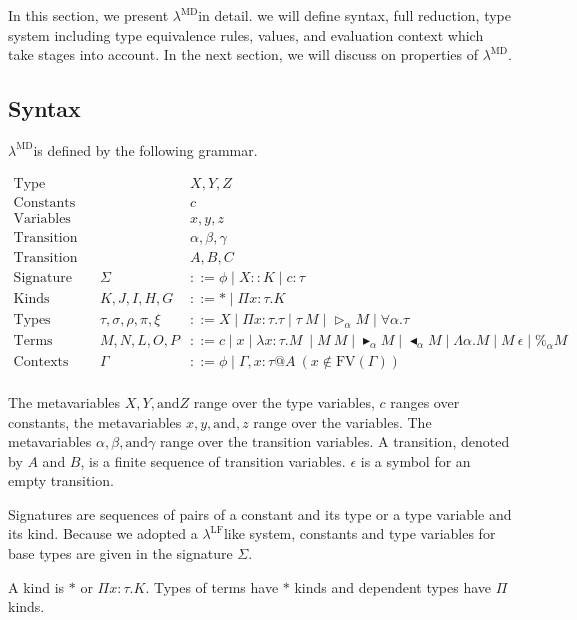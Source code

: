 \documentclass[runningheads]{llncs}
\newcommand{\LMD}{$\lambda^{\textrm{MD}}$}
\newcommand{\LLF}{$\lambda^{\textrm{LF}}$}
\newcommand{\G}{\Gamma}
\newcommand{\TW}{\triangleright}
\newcommand{\F}{\forall}
\newcommand{\TB}{\blacktriangleright}
\newcommand{\TBL}{\blacktriangleleft}
\begin{document}
In this section, we present \LMD in detail. we will define syntax, full reduction, type system including type equivalence rules, values, and evaluation context which take stages into account.
In the next section, we will discuss on properties of \LMD.

\subsection{Syntax}

\LMD is defined by the following grammar.

\begin{align*}
    \textrm{Type variables} && & X,Y,Z \\
    \textrm{Constants} && & c \\
    \textrm{Variables} && & x,y,z \\
    \textrm{Transition variables} && & \alpha,\beta,\gamma \\
    \textrm{Transition} && & A,B,C \\
    \textrm{Signature} && \Sigma & ::= \phi \mid X::K \mid c:\tau \\
    \textrm{Kinds} && K,J,I,H,G & ::= * \mid \Pi x:\tau.K\\
    \textrm{Types} && \tau,\sigma,\rho,\pi,\xi & ::= X \mid \Pi x:\tau.\tau \mid \tau\ M \mid \TW_{\alpha} M \mid \F\alpha.\tau \\
    \textrm{Terms} && M,N,L,O,P & ::= c \mid x \mid \lambda x:\tau.M\ \mid M\ M \mid \TB_\alpha M 
    \mid \TBL_\alpha M \mid \Lambda\alpha.M \mid M\ \epsilon \mid \%_\alpha M\\ 
    \textrm{Contexts} && \Gamma & ::= \phi \mid  \Gamma,x:\tau@A\ (x\not\in\textrm{FV}(\G)) \\
\end{align*}

The metavariables $X, Y, \text{and} Z$ range over the type variables, $c$ ranges over constants, the metavariables $x, y, \text{and}, z$ range over the variables.
The metavariables $\alpha, \beta, \text{and} \gamma$ range over the transition variables.
A transition, denoted by $A$ and $B$, is a finite sequence of transition variables.
$\epsilon$ is a symbol for an empty transition.

Signatures are sequences of pairs of a constant and its type or a type variable and its kind.
Because we adopted a \LLF like system, constants and type variables for base types are given in the signature $\Sigma$.

A kind is $*$ or $\Pi x:\tau.K$. Types of terms have $*$ kinds and dependent types have $\Pi$ kinds.
\end{document}
